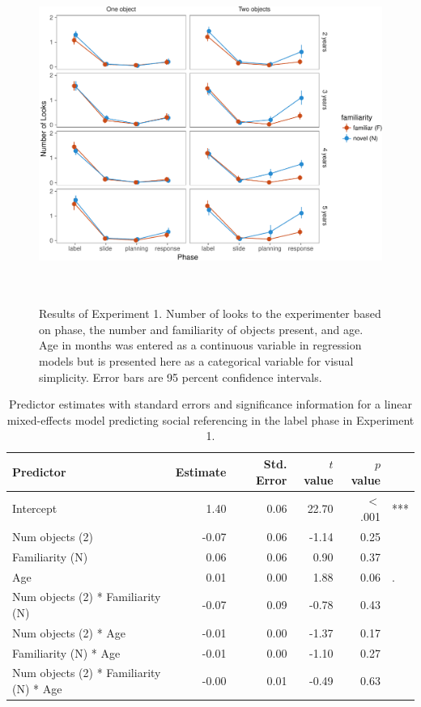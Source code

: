 \documentclass[a4paper,man,apacite,floatsintext]{apa6}
\newenvironment{CodeChunk}{}{}
\begin{document}
\begin{CodeChunk}
\begin{figure}[b]

{\centering \includegraphics[width=5.75in,height=4.35in]{figs/results_e1-1} 

}

\caption[Results of Experiment 1]{Results of Experiment 1. Number of looks to the experimenter based on phase, the number and familiarity of objects present, and age. Age in months was entered as a continuous variable in regression models but is presented here as a categorical variable for visual simplicity. Error bars are 95 percent confidence intervals.}\label{fig:results_e1}
\end{figure}
\end{CodeChunk}

\begin{table}[b]
\centering
\begin{tabular}{lrrrrl}
 Predictor & Estimate & Std. Error & $t$ value & $p$ value &  \\ 
  \hline
Intercept & 1.40 & 0.06 & 22.70 & $<$ .001 & *** \\ 
  Num objects (2) & -0.07 & 0.06 & -1.14 & 0.25 &  \\ 
  Familiarity (N) & 0.06 & 0.06 & 0.90 & 0.37 &  \\ 
  Age & 0.01 & 0.00 & 1.88 & 0.06 & . \\ 
  Num objects (2) * Familiarity (N) & -0.07 & 0.09 & -0.78 & 0.43 &  \\ 
  Num objects (2) * Age & -0.01 & 0.00 & -1.37 & 0.17 &  \\ 
  Familiarity (N) * Age & -0.01 & 0.00 & -1.10 & 0.27 &  \\ 
  Num objects (2) * Familiarity (N) * Age & -0.00 & 0.01 & -0.49 & 0.63 &  \\ 
   \hline
\end{tabular}
\caption{Predictor estimates with standard errors and significance information for a linear mixed-effects model predicting social referencing in the label phase in Experiment 1.} 
\label{tab:exp1_l_reg}
\end{table}
\end{document}
